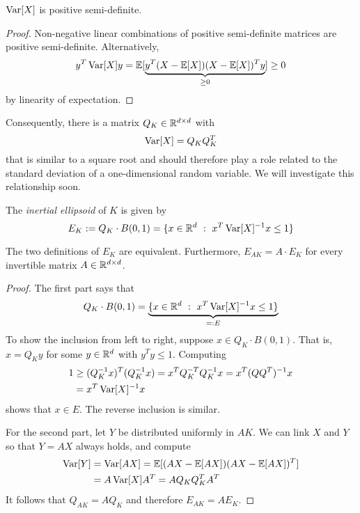 \begin{proposition}
  $\operatorname{Var}[X]$ is positive semi-definite.
\end{proposition}
\begin{proof}
  Non-negative linear combinations of positive semi-definite matrices are positive semi-definite.
  Alternatively,
  \[
    y^T \operatorname{Var}[X] y = \mathbb{E}[ \underbrace{y^T (X - \mathbb{E}[X]) (X - \mathbb{E}[X])^T y}_{\geq 0} ] \geq 0
  \]
  by linearity of expectation.
\end{proof}

Consequently, there is a matrix $Q_K \in \mathbb{R}^{d \times d}$ with
\[
  \operatorname{Var}[X] = Q_K Q_K^T
\]
that is similar to a square root and should therefore play a role related to the standard deviation
of a one-dimensional random variable.
We will investigate this relationship soon.

\begin{definition}
  The \emph{inertial ellipsoid} of $K$ is given by
  \[
    E_K := Q_K \cdot B(0,1) = \{ x \in \mathbb{R}^d ~:~ x^T \operatorname{Var}[X]^{-1} x \leq 1 \}
  \]
\end{definition}

\begin{lemma}
  The two definitions of $E_K$ are equivalent.
  Furthermore, $E_{AK} = A \cdot E_K$ for every invertible matrix $A \in \mathbb{R}^{d \times d}$.
\end{lemma}
\begin{proof}
  The first part says that
  \[
    Q_K \cdot B(0,1) = \underbrace{\{ x \in \mathbb{R}^d ~:~ x^T \operatorname{Var}[X]^{-1} x \leq 1 \}}_{=:E}
  \]
  To show the inclusion from left to right, suppose $x \in Q_K \cdot B(0,1)$.
  That is, $x = Q_K y$ for some $y \in \mathbb{R}^d$ with $y^Ty \leq 1$.
  Computing
  \begin{align*}
    1 &\geq (Q_K^{-1} x)^T (Q_K^{-1} x) = x^T Q_K^{-T} Q_K^{-1} x
     = x^T (Q Q^T)^{-1} x \\
    &= x^T \operatorname{Var}[X]^{-1} x
  \end{align*}
  shows that $x \in E$.
  The reverse inclusion is similar.

  For the second part, let $Y$ be distributed uniformly in $AK$.
  We can link $X$ and $Y$ so that $Y = AX$ always holds, and compute
  \begin{align*}
    \operatorname{Var}[Y] &= \operatorname{Var}[AX] = \mathbb{E}[ (AX - \mathbb{E}[AX]) (AX - \mathbb{E}[AX])^T] \\
       & = A \operatorname{Var}[X] A^T = A Q_K Q_K^T A^T
  \end{align*}
  It follows that $Q_{AK} = A Q_K$ and therefore $E_{AK} = A E_K$.
\end{proof}

